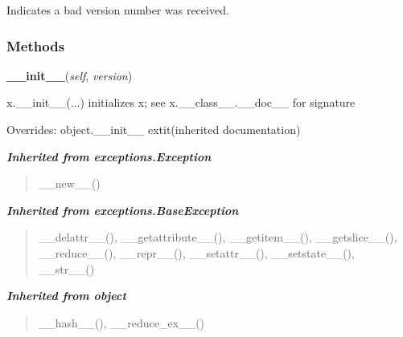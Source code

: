 Indicates a bad version number was received.



  \subsubsection{Methods}

    \vspace{0.5ex}

\hspace{.8\funcindent}\begin{boxedminipage}{\funcwidth}

    \raggedright \textbf{\_\_init\_\_}(\textit{self}, \textit{version})

\setlength{\parskip}{2ex}
    x.\_\_init\_\_(...) initializes x; see x.\_\_class\_\_.\_\_doc\_\_ for 
    signature

\setlength{\parskip}{1ex}
      Overrides: object.\_\_init\_\_ 	extit{(inherited documentation)}

    \end{boxedminipage}


\large{\textbf{\textit{Inherited from exceptions.Exception}}}

\begin{quote}
\_\_new\_\_()
\end{quote}

\large{\textbf{\textit{Inherited from exceptions.BaseException}}}

\begin{quote}
\_\_delattr\_\_(), \_\_getattribute\_\_(), \_\_getitem\_\_(), \_\_getslice\_\_(), \_\_reduce\_\_(), \_\_repr\_\_(), \_\_setattr\_\_(), \_\_setstate\_\_(), \_\_str\_\_()
\end{quote}

\large{\textbf{\textit{Inherited from object}}}

\begin{quote}
\_\_hash\_\_(), \_\_reduce\_ex\_\_()
\end{quote}


